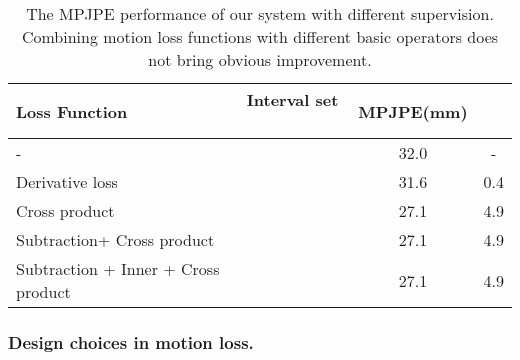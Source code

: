 \documentclass[runningheads]{llncs}
\begin{document}
\begin{table}[htb]
        \scriptsize
        \setlength{\tabcolsep}{0.39em}
    \centering
    \caption { The MPJPE performance of our system with different supervision.
    Combining motion loss functions with different basic operators does not bring obvious improvement.}
    \label{tab: compare2}
    \begin{tabular}{@{}lccc @{}}
    \toprule
    Loss Function & Interval set ~~ & MPJPE(mm) &  \\
    \midrule
    -       & & 32.0 & - \\
    Derivative loss~\cite{rayat2018exploiting}   && 31.6 & 0.4 \\
\midrule
    Cross product   && 27.1 & 4.9 \\
    Subtraction+ Cross product   && 27.1 & 4.9 \\
    Subtraction + Inner + Cross product &  & 27.1 & 4.9 \\
\bottomrule
    \end{tabular}
\end{table}

\subsubsection{Design choices in motion loss.}
\end{document}
